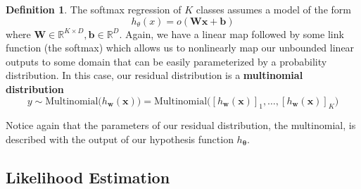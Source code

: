 \documentclass{article}
\theoremstyle{definition}
\newtheorem{definition}{Definition}[section]
\begin{document}
  \begin{definition}
  The softmax regression of $K$ classes assumes a model of the form 
  \[h_\theta (x) = o ( \mathbf{W} \mathbf{x} + \mathbf{b})\]
  where $\mathbf{W} \in \mathbb{R}^{K \times D}, \mathbf{b} \in \mathbb{R}^D$. Again, we have a linear map followed by some link function (the softmax) which allows us to nonlinearly map our unbounded linear outputs to some domain that can be easily parameterized by a probability distribution. In this case, our residual distribution is a \textbf{multinomial distribution} 
  \[y \sim \mathrm{Multinomial}\big( h_\mathbf{w} (\mathbf{x}) \big) = \mathrm{Multinomial}\big( [h_\mathbf{w} (\mathbf{x})]_1, \ldots, [h_\mathbf{w} (\mathbf{x})]_K \big) \]
  \end{definition}

  Notice again that the parameters of our residual distribution, the multinomial, is described with the output of our hypothesis function $h_{\boldsymbol{\theta}}$. 

  \subsection{Likelihood Estimation}
\end{document}
